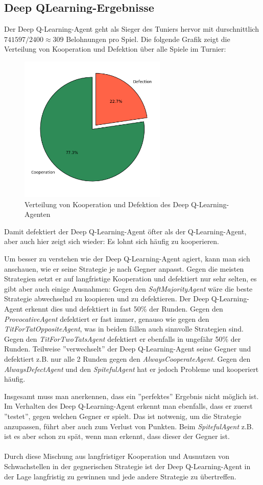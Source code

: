 \subsection{Deep QLearning-Ergebnisse}
Der Deep Q-Learning-Agent geht als Sieger des Tuniers hervor mit durschnittlich $741597 / 2400 \approx 309$ Belohnungen pro Spiel. 
Die folgende Grafik zeigt die Verteilung von Kooperation und Defektion über alle Spiele im Turnier:
\begin{figure}[H]
    \centering
    \includegraphics[width=7cm]{../poster/logos/deepqPie.png}
    \caption{Verteilung von Kooperation und Defektion des Deep Q-Learning-Agenten}
    \label{fig:deepqverteilung}
\end{figure}
Damit defektiert der Deep Q-Learning-Agent öfter als der Q-Learning-Agent, aber auch hier zeigt sich wieder: Es lohnt sich 
häufig zu kooperieren. 

Um besser zu verstehen wie der Deep Q-Learning-Agent agiert, kann man sich anschauen, wie er seine Strategie
je nach Gegner anpasst. Gegen die meisten Strategien setzt er auf langfristige Kooperation und defektiert nur sehr selten, es gibt
aber auch einige Ausnahmen:
Gegen den \textit{SoftMajorityAgent} wäre die beste Strategie abwechselnd zu koopieren und zu defektieren. Der
Deep Q-Learning-Agent erkennt dies und defektiert in fast 50\% der Runden. Gegen den \textit{ProvocativeAgent} defektiert er
fast immer, genauso wie gegen den \textit{TitForTatOppositeAgent}, was in beiden fällen auch sinnvolle Strategien sind. Gegen den 
\textit{TitForTwoTatsAgent} defektiert er ebenfalls in ungefähr 50\% der Runden. Teilweise ''verwechselt'' der Deep Q-Learning-Agent
seine Gegner und defektiert z.B. nur alle 2 Runden gegen den \textit{AlwaysCooperateAgent}. Gegen den \textit{AlwaysDefectAgent}
und den \textit{SpitefulAgent} hat er jedoch Probleme und kooperiert häufig. 

Insgesamt muss man anerkennen, dass ein ''perfektes'' Ergebnis nicht möglich ist. Im Verhalten des Deep Q-Learning-Agent erkennt man ebenfalls,
dass er zuerst ''testet'', gegen welchen Gegner er spielt. Das ist notwenig, um die Strategie anzupassen, führt aber auch zum Verlust von Punkten.
Beim \textit{SpitefulAgent} z.B. ist es aber schon zu spät, wenn man erkennt, dass dieser der Gegner ist. \\ \\
Durch diese Mischung aus langfristiger Kooperation und Ausnutzen von Schwachstellen in der gegnerischen Strategie ist der 
Deep Q-Learning-Agent in der Lage langfristig zu gewinnen und jede andere Strategie zu übertreffen.